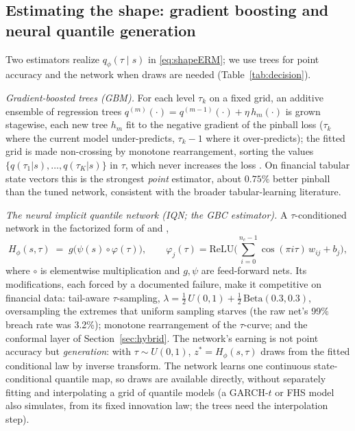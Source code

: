\documentclass[11pt]{article}
\theoremstyle{remark}
\begin{document}
\subsection{Estimating the shape: gradient boosting and neural quantile
generation}\label{sec:gbcmethod}

Two estimators realize $q_\phi(\tau\mid s)$ in \eqref{eq:shapeERM}; we
use trees for point accuracy and the network when draws are needed
(Table~\ref{tab:decision}).

\emph{Gradient-boosted trees (GBM).} For each level $\tau_k$ on a fixed
grid, an additive ensemble of regression trees
$q^{(m)}(\cdot) = q^{(m-1)}(\cdot) + \eta\, h_m(\cdot)$ is grown
stagewise, each new tree $h_m$ fit to the negative gradient of the
pinball loss ($\tau_k$ where the current model under-predicts,
$\tau_k - 1$ where it over-predicts); the fitted grid is made non-crossing by monotone rearrangement, sorting the values
$\{q(\tau_1|s),\dots,q(\tau_K|s)\}$ in $\tau$, which never increases the
loss \citep{cherno2010rearr}. On financial tabular state
vectors this is the strongest \emph{point} estimator, about $0.75\%$ better pinball than the tuned network, consistent with the broader
tabular-learning literature.

\emph{The neural implicit quantile network (IQN; the GBC estimator).} A
$\tau$-conditioned network
in the factorized form of \citet{dabney2018iqn} and
\citet{polson2023gbc},
\begin{equation}
H_\phi(s,\tau) \;=\; g\big(\psi(s)\circ\varphi(\tau)\big),
\qquad
\varphi_j(\tau) = \mathrm{ReLU}\Big(\textstyle\sum_{i=0}^{n_c-1}
\cos(\pi i \tau)\, w_{ij} + b_j\Big),
\label{eq:iqn}
\end{equation}
where $\circ$ is elementwise multiplication and $g,\psi$ are
feed-forward nets. Its modifications, each forced by a documented
failure, make it competitive on financial data: tail-aware
$\tau$-sampling, $\lambda = \tfrac12\,U(0,1) +
\tfrac12\,\mathrm{Beta}(0.3,0.3)$, oversampling the extremes that
uniform sampling starves (the raw net's 99\% breach rate was 3.2\%);
monotone rearrangement of the $\tau$-curve; and the conformal layer of
Section~\ref{sec:hybrid}. The network's earning is not point accuracy
but \emph{generation}: with $\tau\sim U(0,1)$,
$z^{*} = H_\phi(s,\tau)$ draws from the fitted conditional law by
inverse transform. The network learns one continuous
state-conditional quantile map, so draws are available directly,
without separately fitting and interpolating a grid of quantile
models (a GARCH-$t$ or FHS model also simulates, from its fixed
innovation law; the trees need the interpolation step).
\end{document}
